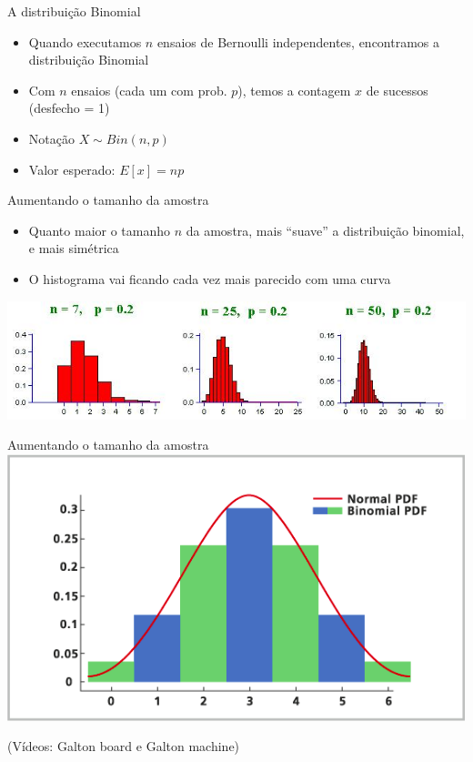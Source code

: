 \documentclass{beamer}
\begin{document}
\begin{frame}{A distribuição Binomial}
  \begin{itemize}
  \item Quando executamos $n$ ensaios de Bernoulli
    \alert{independentes}, encontramos a distribuição Binomial
  \item Com $n$ ensaios (cada um com prob. $p$), temos a contagem $x$
    de sucessos (desfecho = 1)
  \item Notação $X \sim Bin(n,p)$
  \item Valor esperado: $E[x]=np$
  \end{itemize}
\end{frame}

\begin{frame}{Aumentando o tamanho da amostra}
  \begin{itemize}
  \item Quanto maior o tamanho $n$ da amostra, mais ``suave'' a
    distribuição binomial, e mais simétrica
  \item O histograma vai ficando cada vez mais parecido com uma curva
  \end{itemize}
  \includegraphics[width=\textwidth]{Prob_II/binomial2}

\end{frame}

\begin{frame}{Aumentando o tamanho da amostra}
  \includegraphics[width=\textwidth]{Prob_II/aproximacao}

  (Vídeos: Galton board e Galton machine)
\end{frame}
\end{document}

